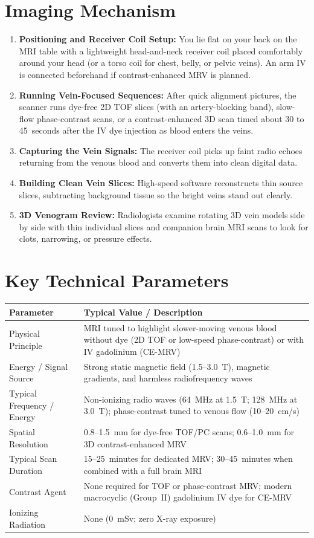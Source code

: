 \section{Imaging Mechanism}
\begin{enumerate}
\item \textbf{Positioning and Receiver Coil Setup:} You lie flat on your back on the MRI table with a lightweight head-and-neck receiver coil placed comfortably around your head (or a torso coil for chest, belly, or pelvic veins). An arm IV is connected beforehand if contrast-enhanced MRV is planned.
\item \textbf{Running Vein-Focused Sequences:} After quick alignment pictures, the scanner runs dye-free 2D TOF slices (with an artery-blocking band), slow-flow phase-contrast scans, or a contrast-enhanced 3D scan timed about 30 to 45~seconds after the IV dye injection as blood enters the veins.
\item \textbf{Capturing the Vein Signals:} The receiver coil picks up faint radio echoes returning from the venous blood and converts them into clean digital data.
\item \textbf{Building Clean Vein Slices:} High-speed software reconstructs thin source slices, subtracting background tissue so the bright veins stand out clearly.
\item \textbf{3D Venogram Review:} Radiologists examine rotating 3D vein models side by side with thin individual slices and companion brain MRI scans to look for clots, narrowing, or pressure effects.
\end{enumerate}

\section{Key Technical Parameters}
\noindent
\begin{tabularx}{\textwidth}{@{}l X@{}}
\toprule
\textbf{Parameter} & \textbf{Typical Value / Description} \\
\midrule
Physical Principle & MRI tuned to highlight slower-moving venous blood without dye (2D TOF or low-speed phase-contrast) or with IV gadolinium (CE-MRV) \\
Energy / Signal Source & Strong static magnetic field (1.5--3.0~T), magnetic gradients, and harmless radiofrequency waves \\
Typical Frequency / Energy & Non-ionizing radio waves (64~MHz at 1.5~T; 128~MHz at 3.0~T); phase-contrast tuned to venous flow (10--20~cm/s) \\
Spatial Resolution & 0.8--1.5~mm for dye-free TOF/PC scans; 0.6--1.0~mm for 3D contrast-enhanced MRV \\
Typical Scan Duration & 15--25~minutes for dedicated MRV; 30--45~minutes when combined with a full brain MRI \\
Contrast Agent & None required for TOF or phase-contrast MRV; modern macrocyclic (Group~II) gadolinium IV dye for CE-MRV \\
Ionizing Radiation & None (0~mSv; zero X-ray exposure) \\
\bottomrule
\end{tabularx}

